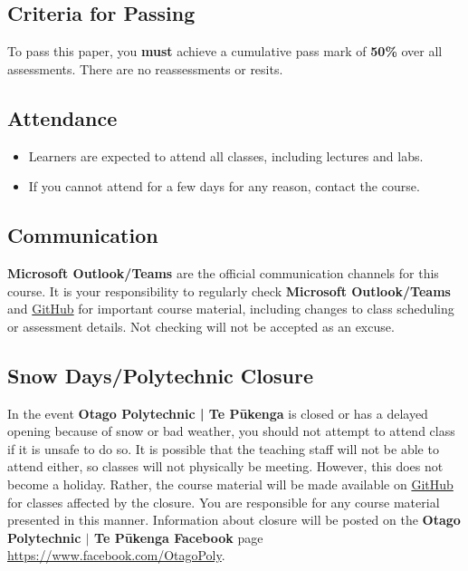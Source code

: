 \documentclass{article}
\begin{document}
\subsection*{Criteria for Passing}
To pass this paper, you \textbf{must} achieve a cumulative pass mark of \textbf{50\%} over all assessments. There are no reassessments or resits.

\subsection*{Attendance}
\begin{itemize}
	\item Learners are expected to attend all classes, including lectures and labs.
	\item If you cannot attend for a few days for any reason, contact the course.
\end{itemize}

\subsection*{Communication}
\textbf{Microsoft Outlook/Teams} are the official communication channels for this course. It is your responsibility to regularly check \textbf{Microsoft Outlook/Teams} and \href{https://github.com/otago-polytechnic-bit-courses/ID608001-intermediate-app-dev-concepts}{GitHub} for important course material, including changes to class scheduling or assessment details. Not checking will not be accepted as an excuse.

\subsection*{Snow Days/Polytechnic Closure}
In the event \textbf{Otago Polytechnic | Te Pūkenga} is closed or has a delayed opening because of snow or bad weather, you should not attempt to attend class if it is unsafe to do so. It is possible that the teaching staff will not be able to attend either, so classes will not physically be meeting. However, this does not become a holiday. Rather, the course material will be made available on \href{https://github.com/otago-polytechnic-bit-courses/ID608001-intermediate-app-dev-concepts}{GitHub} for classes affected by the closure. You are responsible for any course material presented in this manner. Information about closure will be posted on the \textbf{Otago Polytechnic $|$ Te Pūkenga Facebook} page \href{https://www.facebook.com/OtagoPoly}{https://www.facebook.com/OtagoPoly}.
\end{document}
